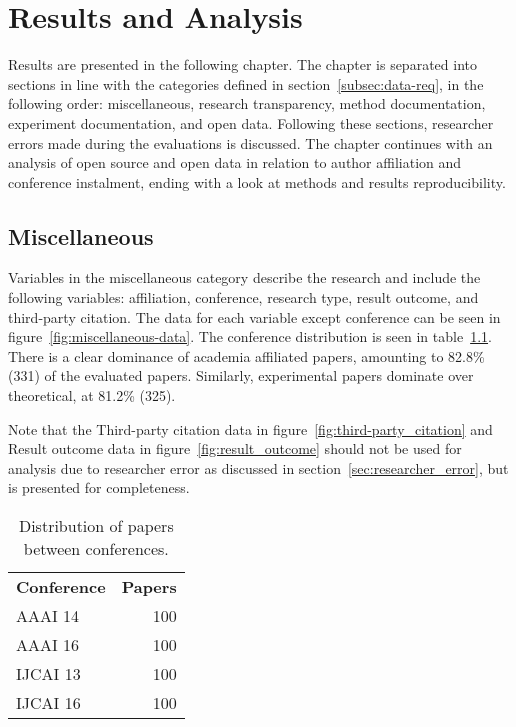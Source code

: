 
\chapter{Results and Analysis}
\label{chap:results}
Results are presented in the following chapter. The chapter is separated into sections in line with the categories defined in section~\ref{subsec:data-req}, in the following order: miscellaneous, research transparency, method documentation, experiment documentation,  and open data. Following these sections, researcher errors made during the evaluations is discussed. The chapter continues with an analysis of open source and open data in relation to author affiliation and conference instalment, ending with a look at methods and results reproducibility.

\section{Miscellaneous}
Variables in the miscellaneous category describe the research and include the following variables: affiliation, conference, research type, result outcome, and third-party citation.
The data for each variable except conference can be seen in figure~\ref{fig:miscellaneous-data}. The conference distribution is seen in table~\ref{tab:conferences}. There is a clear dominance of academia affiliated papers, amounting to 82.8\% (331) of the evaluated papers. Similarly, experimental papers dominate over theoretical, at 81.2\% (325).

Note that the Third-party citation data in figure~\ref{fig:third-party_citation} and Result outcome data in figure~\ref{fig:result_outcome} should not be used for analysis due to researcher error as discussed in section~\ref{sec:researcher_error}, but is presented for completeness.

\begin{table}[!h]
\begin{center}
    \begin{tabular}{ lr }
    \textbf{Conference} & \textbf{Papers} \\
    AAAI 14 & 100 \\
    AAAI 16 & 100 \\
    IJCAI 13 & 100 \\
    IJCAI 16 & 100 \\
    \end{tabular}
\end{center}
\caption{Distribution of papers between conferences.}
\label{tab:conferences}
\end{table}

